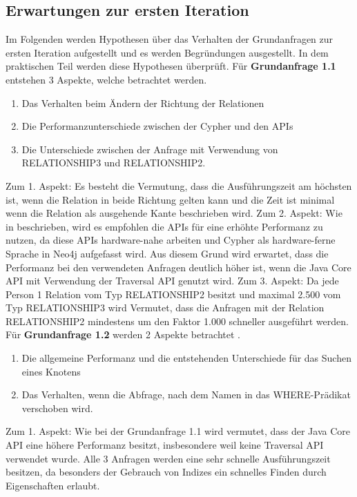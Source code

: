 \subsection{Erwartungen zur ersten Iteration}
Im Folgenden werden Hypothesen über das Verhalten der Grundanfragen zur ersten Iteration aufgestellt und es werden  Begründungen ausgestellt. In dem praktischen Teil werden diese Hypothesen überprüft. \newline \newline
Für \textbf{Grundanfrage 1.1} entstehen 3 Aspekte, welche betrachtet werden.
\begin{enumerate}
\item Das Verhalten beim Ändern der Richtung der Relationen
\item Die Performanzunterschiede zwischen der Cypher und den APIs
\item Die Unterschiede zwischen der Anfrage mit Verwendung von RELATIONSHIP3 und RELATIONSHIP2.
\end{enumerate}
Zum 1. Aspekt: Es besteht die Vermutung, dass die Ausführungszeit am höchsten ist, wenn die Relation in beide Richtung gelten kann und die Zeit ist minimal wenn die Relation als ausgehende Kante beschrieben wird. \newline
 Zum 2. Aspekt: Wie in \parencite{raj2015neo4j} beschrieben, wird es empfohlen die APIs für eine erhöhte Performanz zu nutzen, da diese APIs hardware-nahe arbeiten und Cypher als hardware-ferne Sprache in Neo4j aufgefasst wird. Aus diesem Grund wird erwartet, dass die Performanz bei den verwendeten Anfragen deutlich höher ist, wenn die Java Core API mit Verwendung der Traversal API genutzt wird. \newline
Zum 3. Aspekt: Da jede Person 1 Relation vom Typ RELATIONSHIP2 besitzt und maximal 2.500 vom Typ RELATIONSHIP3 wird Vermutet, dass die Anfragen mit der Relation RELATIONSHIP2 mindestens um den Faktor 1.000 schneller ausgeführt werden. \newline \newline
Für \textbf{Grundanfrage 1.2} werden 2 Aspekte betrachtet .
\begin{enumerate}
	\item Die allgemeine Performanz und die entstehenden Unterschiede für das Suchen eines Knotens
	\item Das Verhalten, wenn die Abfrage, nach dem Namen in das WHERE-Prädikat verschoben wird.
\end{enumerate}
Zum 1. Aspekt: Wie bei der Grundanfrage 1.1 wird vermutet, dass der Java Core API eine höhere Performanz besitzt, insbesondere weil keine Traversal API verwendet wurde. Alle 3 Anfragen werden eine sehr schnelle Ausführungszeit besitzen, da besonders der Gebrauch von Indizes ein schnelles Finden durch Eigenschaften erlaubt. \newline
